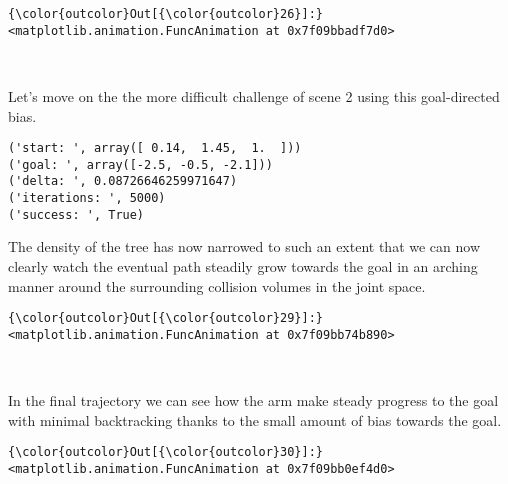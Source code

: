 \documentclass{article}
\begin{document}
            \begin{Verbatim}[commandchars=\\\{\}]
{\color{outcolor}Out[{\color{outcolor}26}]:} <matplotlib.animation.FuncAnimation at 0x7f09bbadf7d0>
\end{Verbatim}
        
    \begin{center}
    \end{center}
    { \hspace*{\fill} \\}
    
    Let's move on the the more difficult challenge of scene 2 using this
goal-directed bias.


    \begin{Verbatim}[commandchars=\\\{\}]
('start: ', array([ 0.14,  1.45,  1.  ]))
('goal: ', array([-2.5, -0.5, -2.1]))
('delta: ', 0.08726646259971647)
('iterations: ', 5000)
('success: ', True)
    \end{Verbatim}

    The density of the tree has now narrowed to such an extent that we can
now clearly watch the eventual path steadily grow towards the goal in an
arching manner around the surrounding collision volumes in the joint
space.



            \begin{Verbatim}[commandchars=\\\{\}]
{\color{outcolor}Out[{\color{outcolor}29}]:} <matplotlib.animation.FuncAnimation at 0x7f09bb74b890>
\end{Verbatim}
        
    \begin{center}
    \end{center}
    { \hspace*{\fill} \\}
    
    In the final trajectory we can see how the arm make steady progress to
the goal with minimal backtracking thanks to the small amount of bias
towards the goal.


            \begin{Verbatim}[commandchars=\\\{\}]
{\color{outcolor}Out[{\color{outcolor}30}]:} <matplotlib.animation.FuncAnimation at 0x7f09bb0ef4d0>
\end{Verbatim}
        
\end{document}
